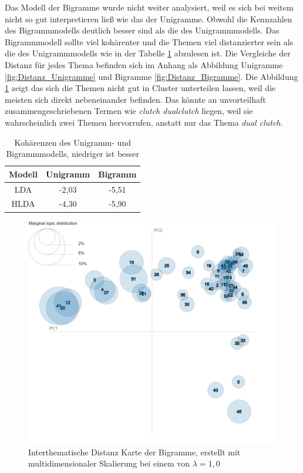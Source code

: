 Das Modell der Bigramme wurde nicht weiter analysiert, weil es sich bei weitem nicht so gut interpretieren ließ wie das der Unigramme. Obwohl die Kennzahlen des Bigrammmodells deutlich besser sind als die des Unigrammmodells. Das Bigrammmodell sollte viel kohärenter und die Themen viel distanzierter sein als die des Unigrammmodells wie in der Tabelle \ref{table:Kohärenzen} abzulesen ist. Die Vergleiche der Distanz für jedes Thema befinden sich im Anhang als Abbildung Unigramme \ref{fig:Distanz_Unigramme} und Bigramme \ref{fig:Distanz_Bigramme}. Die Abbildung \ref{fig:MDS_Bigramme} zeigt das sich die Themen nicht gut in Cluster unterteilen lassen, weil die meisten sich direkt nebeneinander befinden. Das könnte an unvorteilhaft zusammengeschriebenen Termen wie \emph{clutch dualclutch} liegen, weil sie wahrscheinlich zwei Themen hervorrufen, anstatt nur das Thema \emph{dual clutch}.

\begin{table}
	\RawFloats
	\centering
	\caption{Kohärenzen des Unigramm- und Bigrammmodells, niedriger ist besser}
	\begin{tabular}{|c|c|c|}
		\hline
		Modell & Unigramm & Bigramm \\
		\hline
		LDA & -2,03 & -5,51 \\
		\hline
		HLDA & -4,30 & -5,90 \\
		\hline
	\end{tabular}
	\label{table:Kohärenzen}
\end{table} 

\begin{figure}[htpb]
	\centering
	\includegraphics[width=\textwidth,keepaspectratio=true]{img/LDAvisGM-3-2-5blank.png}
	\caption{
		Interthematische Distanz Karte der Bigramme, erstellt mit multidimensionaler Skalierung bei einem von $\lambda = 1,0$
	}
	\label{fig:MDS_Bigramme}
\end{figure}

